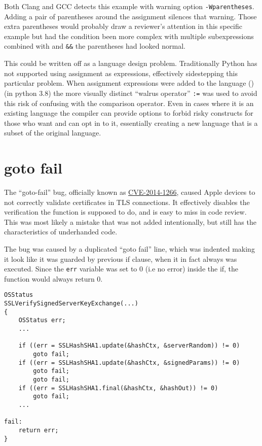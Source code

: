 \documentclass[
  a4paper,
]{report}
\begin{document}
Both Clang and GCC detects this example with warning option
\texttt{-Wparentheses}. Adding a pair of parentheses around the
assignment silences that warning. Those extra parentheses would probably
draw a reviewer's attention in this specific example but had the
condition been more complex with multiple subexpressions combined with
\texttt{\textbar{}\textbar{}} and \texttt{\&\&} the parentheses had
looked normal.

This could be written off as a language design problem. Traditionally
Python has not supported using assignment as expressions, effectively
sidestepping this particular problem. When assignment expressions were
added to the language () (in python 3.8) the more visually distinct ``walrus
operator'' \texttt{:=} was used to avoid this risk of confusing with the
comparison operator. Even in cases where it is an existing language the
compiler can provide options to forbid risky constructs for those who
want and can opt in to it, essentially creating a new language that is a
subset of the original language.

\section{goto fail}\label{goto-fail}

The ``goto-fail'' bug, officially known as
\href{https://nvd.nist.gov/vuln/detail/CVE-2014-1266}{CVE-2014-1266},
caused Apple devices to not correctly validate certificates in TLS
connections. It effectively disables the verification the function is
supposed to do, and is easy to miss in code review. This was most likely
a mistake that was not added intentionally, but still has the
characteristics of underhanded code.

The bug was caused by a duplicated ``goto fail'' line, which was
indented making it look like it was guarded by previous if clause, when
it in fact always was executed. Since the \texttt{err} variable was set
to 0 (i.e no error) inside the if, the function would always return 0.

\begin{verbatim}
OSStatus
SSLVerifySignedServerKeyExchange(...)
{
    OSStatus err;
    ...

    if ((err = SSLHashSHA1.update(&hashCtx, &serverRandom)) != 0)
        goto fail;
    if ((err = SSLHashSHA1.update(&hashCtx, &signedParams)) != 0)
        goto fail;
        goto fail;
    if ((err = SSLHashSHA1.final(&hashCtx, &hashOut)) != 0)
        goto fail;
    ...

fail:
    return err;
}
\end{verbatim}
\end{document}
